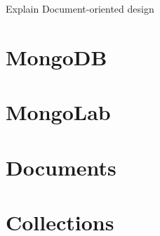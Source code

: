 
Explain Document-oriented design 

\section{MongoDB}

\section{MongoLab}

\section{Documents}

\section{Collections}

